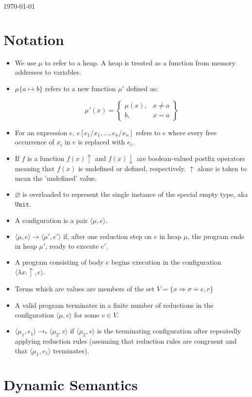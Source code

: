 \documentclass{llncs}
\newcommand{\keywadj}[1]{\mathtt{#1}}
\newcommand{\config}[1] { \langle #1 \rangle }
\begin{document}
\today

\section{Notation}

\begin{itemize}
	\item We use $\mu$ to refer to a heap. A heap is treated as a function from memory addresses to variables.
	\item $\mu\{a \mapsto b\}$ refers to a new function $\mu'$ defined as:
	
\[
\mu'(x) = 
\left\{\begin{array}{lr}
	\mu(x), & x \neq a \\
	b, & x = a
\end{array}\right\}
\]
	\item For an expression $e$, $e[e_1/x_1, ..., e_n/x_n]$ refers to $e$ where every free occurrence of $x_i$ in $e$ is replaced with $e_i$.
	\item If $f$ is a function $f(x) \uparrow$ and $f(x) \downarrow$ are boolean-valued postfix operators meaning that $f(x)$ is undefined or defined, respectively. $\uparrow$ alone is taken to mean the 'undefined' value.
	\item $\varnothing$ is overloaded to represent the single instance of the special empty type, aka $\keywadj{Unit}$.
	\item A configuration is a pair $\config{\mu, e}$.
	\item $\config{\mu, e} \longrightarrow \config{\mu', e'}$ if, after one reduction step on $e$ in heap $\mu$, the program ends in heap $\mu'$, ready to execute $e'$.
	\item A program consisting of body $e$ begins execution in the configuration $\config{\lambda x . \uparrow, e}$.
	\item Terms which are values are members of the set $V = \{ x \Rightarrow \overline{\sigma = e}, r \}$
	\item A valid program terminates in a finite number of reductions in the configuration $\config{\mu, v}$ for some $v \in V$.
	\item $\config{\mu_1, e_1} \longrightarrow_* \config{\mu_2, v}$ if $\config{\mu_2, v}$ is the terminating configuration after repeatedly applying reduction rules (assuming that reduction rules are congruent and that $\config{\mu_1, e_1}$ terminates).
\end{itemize}

\section{Dynamic Semantics}
\end{document}
